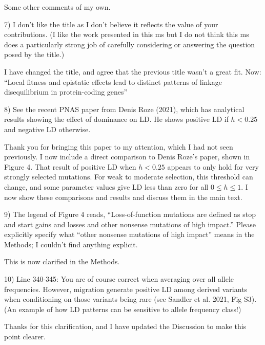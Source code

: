 \documentclass{article}
\newenvironment{response}%
  {\list{}{\leftmargin=0.5in\rightmargin=0.5in\color{blue}}\item[]}%
  {\endlist}
\begin{document}
Some other comments of my own.

7) I don't like the title as I don't believe it reflects the value of your
contributions. (I like the work presented in this ms but I do not think this ms
does a particularly strong job of carefully considering or answering the
question posed by the title.)

\begin{response}
    I have changed the title, and agree that the previous title wasn't a great
    fit. Now:
    ``Local fitness and epistatic effects lead to distinct patterns
    of linkage disequilibrium in protein-coding genes''
\end{response}

8) See the recent PNAS paper from Denis Roze (2021), which has analytical
results showing the effect of dominance on LD. He shows positive LD if $h < 0.25$
and negative LD otherwise.

\begin{response}
    Thank you for bringing this paper to my attention, which I had not seen
    previously. I now include a direct comparison to Denis Roze's paper, shown
    in Figure 4. That result of positive LD when $h<0.25$ appears to only hold
    for very strongly selected mutations. For weak to moderate selection,
    this threshold can change, and some parameter values give LD less than zero
    for all $0 \leq h \leq 1$. I now show these comparisons and results and discuss
    them in the main text.
\end{response}

9) The legend of Figure 4 reads, ``Loss-of-function mutations are defined as
stop and start gains and losses and other nonsense mutations of high impact.''
Please explicitly specify what ``other nonsense mutations of high impact'' means
in the Methods; I couldn't find anything explicit.

\begin{response}
    This is now clarified in the Methods.
\end{response}

10) Line 340-345: You are of course correct when averaging over all allele
frequencies. However, migration generate positive LD among derived variants
when conditioning on those variants being rare (see Sandler et al. 2021, Fig
S3). (An example of how LD patterns can be sensitive to allele frequency
class!)

\begin{response}
    Thanks for this clarification, and I have updated the Discussion to
    make this point clearer.
\end{response}
\end{document}
